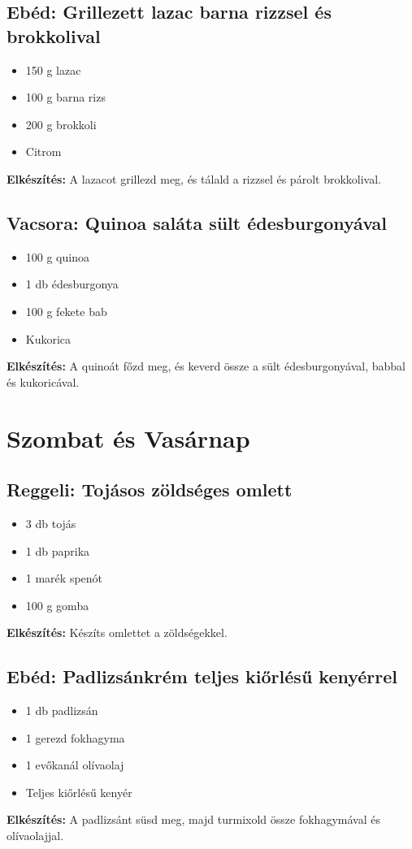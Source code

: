 \documentclass[a4paper,12pt]{article}
\begin{document}
\subsection{Ebéd: Grillezett lazac barna rizzsel és brokkolival}
\begin{itemize}
    \item 150 g lazac
    \item 100 g barna rizs
    \item 200 g brokkoli
    \item Citrom
\end{itemize}
\textbf{Elkészítés:} A lazacot grillezd meg, és tálald a rizzsel és párolt brokkolival.

\subsection{Vacsora: Quinoa saláta sült édesburgonyával}
\begin{itemize}
    \item 100 g quinoa
    \item 1 db édesburgonya
    \item 100 g fekete bab
    \item Kukorica
\end{itemize}
\textbf{Elkészítés:} A quinoát főzd meg, és keverd össze a sült édesburgonyával, babbal és kukoricával.

\newpage

\section{Szombat és Vasárnap}
\subsection{Reggeli: Tojásos zöldséges omlett}
\begin{itemize}
    \item 3 db tojás
    \item 1 db paprika
    \item 1 marék spenót
    \item 100 g gomba
\end{itemize}
\textbf{Elkészítés:} Készíts omlettet a zöldségekkel.

\subsection{Ebéd: Padlizsánkrém teljes kiőrlésű kenyérrel}
\begin{itemize}
    \item 1 db padlizsán
    \item 1 gerezd fokhagyma
    \item 1 evőkanál olívaolaj
    \item Teljes kiőrlésű kenyér
\end{itemize}
\textbf{Elkészítés:} A padlizsánt süsd meg, majd turmixold össze fokhagymával és olívaolajjal.
\end{document}

